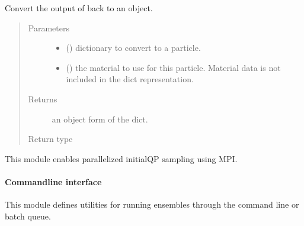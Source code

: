 \documentclass[letterpaper,10pt,english]{sphinxmanual}
\begin{document}
\begin{fulllineitems}
\label{\detokenize{interface:scdc.mpi.sim.particle_from_dict}}
Convert the output of  back to an object.
\begin{quote}\begin{description}
\item[{Parameters}] \leavevmode\begin{itemize}
\item {} 
 () \textendash{} dictionary to convert to a particle.

\item {} 
 () \textendash{} the material to use for this particle.
Material data is not included in the dict representation.

\end{itemize}

\item[{Returns}] \leavevmode
an object form of the dict.

\item[{Return type}] \leavevmode
{}

\end{description}\end{quote}

\end{fulllineitems}

\label{\detokenize{interface:module-scdc.mpi.initial}}
This module enables parallelized initial\sphinxhyphen{}QP sampling using MPI.


\paragraph{Command\sphinxhyphen{}line interface}
\label{\detokenize{interface:module-scdc.interface}}\label{\detokenize{interface:command-line-interface}}
This module defines utilities for running ensembles through the command
line or batch queue.
\end{document}
